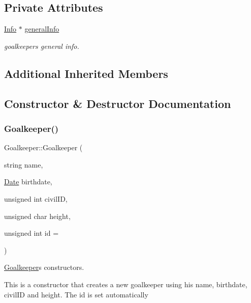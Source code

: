 \subsection*{Private Attributes}
\begin{DoxyCompactItemize}
\item 
\hyperlink{class_info}{Info} $\ast$ \hyperlink{class_goalkeeper_a30367439b905583e7b5562d19ab531f3}{general\+Info}
\begin{DoxyCompactList}\small\item\em goalkeeper\textquotesingle{}s general info. \end{DoxyCompactList}\end{DoxyCompactItemize}
\subsection*{Additional Inherited Members}


\subsection{Constructor \& Destructor Documentation}
\hypertarget{class_goalkeeper_a41b559a66be23a792b36e7872dedc58e}{}\label{class_goalkeeper_a41b559a66be23a792b36e7872dedc58e} 
\subsubsection{\texorpdfstring{Goalkeeper()}{Goalkeeper()}\hspace{0.1cm}{\footnotesize\ttfamily [1/2]}}
{\footnotesize\ttfamily Goalkeeper\+::\+Goalkeeper (\begin{DoxyParamCaption}\item[{string}]{name,  }\item[{\hyperlink{class_date}{Date}}]{birthdate,  }\item[{unsigned int}]{civil\+ID,  }\item[{unsigned char}]{height,  }\item[{unsigned int}]{id = {} }\end{DoxyParamCaption})}



\hyperlink{class_goalkeeper}{Goalkeeper}\textquotesingle{}s constructors. 

This is a constructor that creates a new goalkeeper using his name, birthdate, civil\+ID and height. The id is set automatically 

